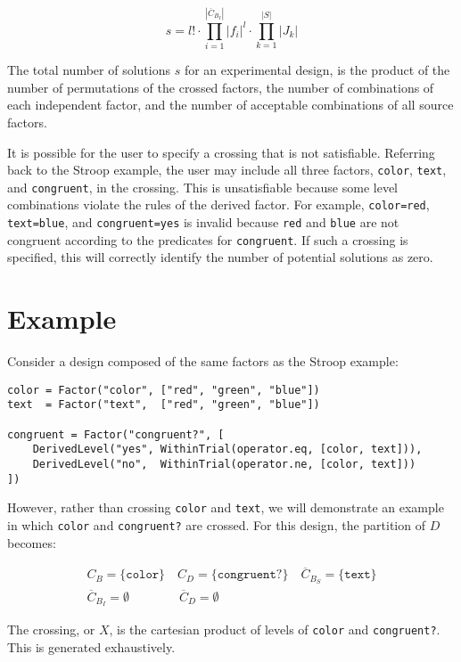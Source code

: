 \[
s = l! \cdot \prod_{i=1}^{|\overline{C}_{B_I}|} |f_i|^l \cdot \prod_{k=1}^{|S|} |J_k|
\]

The total number of solutions $s$ for an experimental design, is the product of the number of permutations of the crossed factors, the number of combinations of each independent factor, and the number of acceptable combinations of all source factors.

It is possible for the user to specify a crossing that is not satisfiable. Referring back to the Stroop example, the user may include all three factors, \texttt{color}, \texttt{text}, and \texttt{congruent}, in the crossing. This is unsatisfiable because some level combinations violate the rules of the derived factor. For example, \texttt{color=red}, \texttt{text=blue}, and \texttt{congruent=yes} is invalid because \texttt{red} and \texttt{blue} are not congruent according to the predicates for \texttt{congruent}. If such a crossing is specified, this will correctly identify the number of potential solutions as zero.

\section{Example}

Consider a design composed of the same factors as the Stroop example:

\begin{verbatim}
color = Factor("color", ["red", "green", "blue"])
text  = Factor("text",  ["red", "green", "blue"])

congruent = Factor("congruent?", [
    DerivedLevel("yes", WithinTrial(operator.eq, [color, text])),
    DerivedLevel("no",  WithinTrial(operator.ne, [color, text]))
])
\end{verbatim}

However, rather than crossing \texttt{color} and \texttt{text}, we will demonstrate an example in which \texttt{color} and \texttt{congruent?} are crossed. For this design, the partition of $D$ becomes:

\begin{gather*}
    C_B = \{\texttt{color}\} \quad C_D = \{\texttt{congruent?}\}  \quad  \overline{C}_{B_S} = \{\texttt{text}\} \\
    \overline{C}_{B_I} = \emptyset \qquad\qquad \overline{C}_D = \emptyset
\end{gather*}

The crossing, or $X$, is the cartesian product of levels of \texttt{color} and \texttt{congruent?}. This is generated exhaustively.

